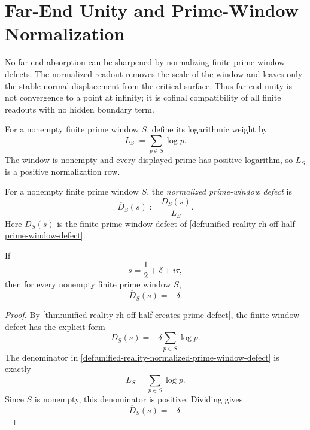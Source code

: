 \section{Far-End Unity and Prime-Window Normalization}
\label{sec:unified-reality-far-end-unity-prime-window-normalization}

No far-end absorption can be sharpened by normalizing finite
prime-window defects.  The normalized readout removes the scale of the
window and leaves only the stable normal displacement from the critical
surface.  Thus far-end unity is not convergence to a point at infinity;
it is cofinal compatibility of all finite readouts with no hidden
boundary term.

\begin{definition}
\label{def:unified-reality-prime-window-logarithmic-weight}
For a nonempty finite prime window $S$, define its logarithmic weight by
$$
L_S:=\sum_{p\in S}\log p.
$$
The window is nonempty and every displayed prime has positive logarithm,
so $L_S$ is a positive normalization row.
\end{definition}

\begin{definition}
\label{def:unified-reality-normalized-prime-window-defect}
For a nonempty finite prime window $S$, the \emph{normalized
prime-window defect} is
$$
\overline D_S(s)
:=
\frac{D_S(s)}{L_S}.
$$
Here $D_S(s)$ is the finite prime-window defect of
\autoref{def:unified-reality-rh-off-half-prime-window-defect}.
\end{definition}

\begin{theorem}
\label{thm:unified-reality-normalized-defects-constant-over-windows}
If
$$
s=\frac12+\delta+i\tau,
$$
then for every nonempty finite prime window $S$,
$$
\overline D_S(s)=-\delta.
$$
\end{theorem}

\begin{proof}
By
\autoref{thm:unified-reality-rh-off-half-creates-prime-defect}, the
finite-window defect has the explicit form
$$
D_S(s)
=
-\delta\sum_{p\in S}\log p.
$$
The denominator in
\autoref{def:unified-reality-normalized-prime-window-defect} is exactly
$$
L_S=\sum_{p\in S}\log p.
$$
Since $S$ is nonempty, this denominator is positive.  Dividing gives
$$
\overline D_S(s)=-\delta.
$$
\end{proof}

